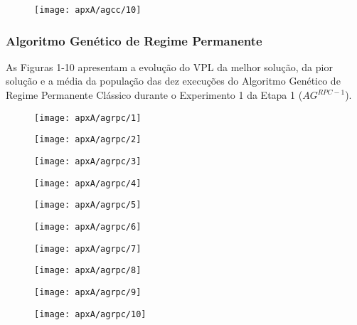 \begin{figure}[H]
\centering
\label{fig:graphGC1-10}
\texttt{[image: apxA/agcc/10]}
\end{figure}

\subsubsection{Algoritmo Genético de Regime Permanente}
As Figuras 1-10 apresentam a evolução do VPL da melhor solução, da pior solução e a média da população das dez execuções do Algoritmo Genético de Regime Permanente Clássico durante o Experimento 1 da Etapa 1 ($AG^{RPC-1}$).

\begin{figure}[H]
\centering

\texttt{[image: apxA/agrpc/1]}
\end{figure}

\begin{figure}[H]
\centering

\texttt{[image: apxA/agrpc/2]}
\end{figure}

\begin{figure}[H]
\centering

\texttt{[image: apxA/agrpc/3]}
\end{figure}

\begin{figure}[H]
\centering

\texttt{[image: apxA/agrpc/4]}
\end{figure}

\begin{figure}[H]
\centering

\texttt{[image: apxA/agrpc/5]}
\end{figure}

\begin{figure}[H]
\centering

\texttt{[image: apxA/agrpc/6]}
\end{figure}

\begin{figure}[H]
\centering

\texttt{[image: apxA/agrpc/7]}
\end{figure}

\begin{figure}[H]
\centering

\texttt{[image: apxA/agrpc/8]}
\end{figure}

\begin{figure}[H]
\centering

\texttt{[image: apxA/agrpc/9]}
\end{figure}

\begin{figure}[H]
\centering

\texttt{[image: apxA/agrpc/10]}
\end{figure}